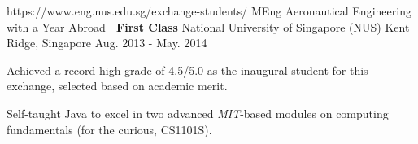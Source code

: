 \begin{cventries}
  \cventry
    {https://www.eng.nus.edu.sg/exchange-students/}
    {MEng Aeronautical Engineering with a Year Abroad | \textbf{First Class}} %
    {National University of Singapore (NUS)} %
    {Kent Ridge, Singapore} %
    {Aug. 2013 - May. 2014} %
    {
      \begin{cvitems} %
        \item {Achieved a record high grade of \underline{4.5/5.0} as the inaugural student for this exchange, selected based on academic merit.}
        \item {Self-taught Java to excel in two advanced \emph{MIT}-based modules on computing fundamentals (for the curious, CS1101S).}
      \end{cvitems}
    }
    
\end{cventries}